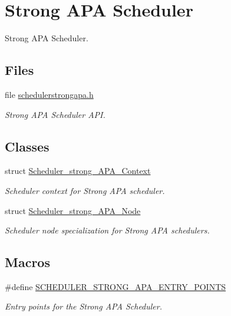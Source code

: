 \hypertarget{group__RTEMSScoreSchedulerStrongAPA}{}\section{Strong A\+PA Scheduler}
\label{group__RTEMSScoreSchedulerStrongAPA}


Strong A\+PA Scheduler.  


\subsection*{Files}
\begin{DoxyCompactItemize}
\item 
file \hyperlink{schedulerstrongapa_8h}{schedulerstrongapa.\+h}
\begin{DoxyCompactList}\small\item\em Strong A\+PA Scheduler A\+PI. \end{DoxyCompactList}\end{DoxyCompactItemize}
\subsection*{Classes}
\begin{DoxyCompactItemize}
\item 
struct \hyperlink{structScheduler__strong__APA__Context}{Scheduler\+\_\+strong\+\_\+\+A\+P\+A\+\_\+\+Context}
\begin{DoxyCompactList}\small\item\em Scheduler context for Strong A\+PA scheduler. \end{DoxyCompactList}\item 
struct \hyperlink{structScheduler__strong__APA__Node}{Scheduler\+\_\+strong\+\_\+\+A\+P\+A\+\_\+\+Node}
\begin{DoxyCompactList}\small\item\em Scheduler node specialization for Strong A\+PA schedulers. \end{DoxyCompactList}\end{DoxyCompactItemize}
\subsection*{Macros}
\begin{DoxyCompactItemize}
\item 
\#define \hyperlink{group__RTEMSScoreSchedulerStrongAPA_ga98b37281082c0be47dc489eed554c5cc}{S\+C\+H\+E\+D\+U\+L\+E\+R\+\_\+\+S\+T\+R\+O\+N\+G\+\_\+\+A\+P\+A\+\_\+\+E\+N\+T\+R\+Y\+\_\+\+P\+O\+I\+N\+TS}
\begin{DoxyCompactList}\small\item\em Entry points for the Strong A\+PA Scheduler. \end{DoxyCompactList}\end{DoxyCompactItemize}
